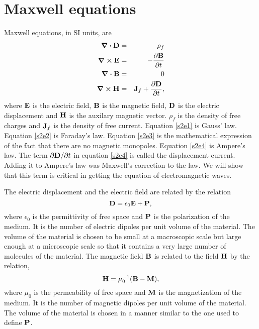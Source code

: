 \documentclass[11pt]{article}
\numberwithin{equation}{section}
\begin{document}
\section{Maxwell equations}\label{s2}
Maxwell equations, in SI units, are
\begin{eqnarray}
\div\vb{D} &=& \rho_f \label{s2e1} \\
\curl\vb{E} &=& -\pdv{\vb{B}}{t} \label{s2e2} \\
\div\vb{B} &=& 0 \label{s2e3} \\
\curl\vb{H} &=& \vb{J}_f + \pdv{\vb{D}}{t}, \label{s2e4}
\end{eqnarray}
where $\vb{E}$ is the electric field, $\vb{B}$ is the magnetic field,
$\vb{D}$ is the electric displacement and $\vb{H}$ is the auxilary magnetic
vector. $\rho_f$ is the density of free charges and $\vb{J}_f$ is the 
density of free current. Equation \eqref{s2e1} is Gauss' law. Equation
\eqref{s2e2} is Faraday's law. Equation \eqref{s2e3} is the mathematical
expression of the fact that there are no magnetic monopoles. Equation
\eqref{s2e4} is Ampere's law. The term $\partial\vb{D}/\partial t$ in equation
\eqref{s2e4} is called the displacement current. Adding it to Ampere's law
was Maxwell's correction to the law. We will show that this term is critical
in getting the equation of electromagnetic waves.

The electric displacement and the electric field
are related by the relation
\begin{equation}\label{s2e5}
\vb{D} = \epsilon_0\vb{E} + \vb{P},
\end{equation}
where $\epsilon_0$ is the permittivity of free space and $\vb{P}$ is the
polarization of the medium. It is the number of electric dipoles per unit
volume of the material. The volume of the material is chosen to be small at
a macroscopic scale but large enough at a microscopic scale so that it contains
a very large number of molecules of the material. The magnetic field $\vb{B}$
is related to the field $\vb{H}$ by the relation,
\begin{equation}\label{s2e6}
\vb{H} = \mu_0^{-1}(\vb{B} - \vb{M}),
\end{equation}
where $\mu_0$ is the permeability of free space and $\vb{M}$ is the 
magnetization of the medium. It is the number of magnetic dipoles per unit
volume of the material. The volume of the material is chosen in a manner 
similar to the one used to define $\vb{P}$. 
\end{document}
